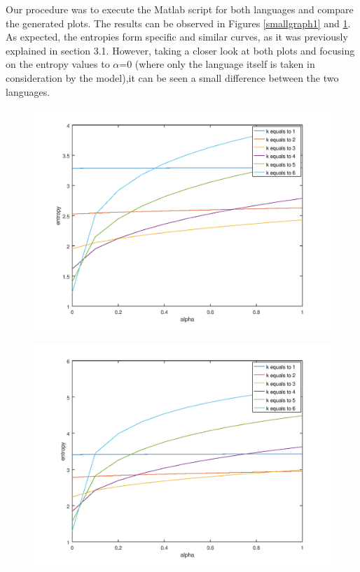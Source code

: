 \documentclass[12pt]{article}
\begin{document}
Our procedure was to execute the Matlab script for both languages and compare
the generated plots.
The results can be observed in Figures \ref{smallgraph1} and \ref{smallgraph2}.
As expected, the entropies form specific and similar curves, as it was 
previously explained in section 3.1. 
However, taking a closer look at both plots and focusing on the entropy values 
to $\alpha$=0 (where only the language itself is taken in consideration by the 
model),it can be seen a small difference between the two languages.

\begin{figure}[H]
  \centering
  \begin{minipage}{.5\textwidth}
    \centering
    \includegraphics[width=\linewidth]{bible_en.png}
    \label{smallgraph1}
  \end{minipage}%
  \begin{minipage}{.5\textwidth}
    \centering
    \includegraphics[width=\linewidth]{bible_pt.png}
    \label{smallgraph2}
  \end{minipage}
\end{figure}
\end{document}
